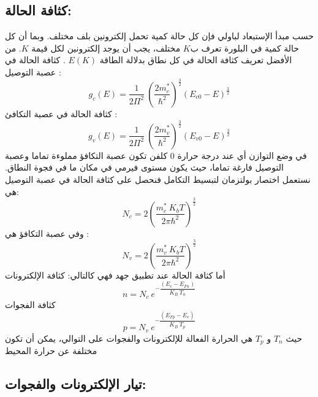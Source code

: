 \begin{itemize}
	\subsection{كثافة الحالة:}
	حسب مبدأ الإستبعاد لباولي فإن كل حالة كمية تحمل إلكترونين بلف مختلف. وبما أن كل حالة كمية في البلورة تعرف ب$ K $ مختلف، يجب أن يوجد إلكترونين لكل قيمة $ K $. 
	من الأفضل تعريف كثافة الحالة في كل نطاق بدلالة الطاقة $ E(K) $ .
	كثافة الحالة في عصبة التوصيل : 
	\begin{equation}
		g_c\left( E \right) = \frac{1}{2 \Pi^{2}}\ \left( \dfrac{2m^{*}_c}{\hbar^{2}} \right)^{\frac{3}{2}}\left(  E_{c0} - E \right)^{\frac{3}{2}}   
	\end{equation}
	كثافة الحالة في عصبة التكافئ : 
	\begin{equation}
		g_v\left( E \right) = \frac{1}{2 \Pi^{2}}\ \left( \dfrac{2m^{*}_v}{\hbar^{2}} \right)^{\frac{3}{2}}\left(  E_{v0} - E \right)^{\frac{3}{2}}   
	\end{equation}
	في وضع التوازن أي عند درجة حرارة 0 كلفن تكون عصبة التكافؤ مملوءة تماما وعصبة التوصيل فارغة تماما، حيث يكون مستوى فيرمي في مكان ما في فجوة النطاق. نستعمل اختصار بولتزمان لتبسيط التكامل فنحصل على كثافة الحالة في عصبة التوصيل هي: 
	\begin{equation}
		N_c = 2 \left( \dfrac{m^{*}_c\ K_b T}{2 \pi \hbar^{2}} \right) ^{\frac{3}{2}}
	\end{equation}
	وفي عصبة التكافؤ هي :
	\begin{equation}
		N_v = 2 \left( \dfrac{m^{*}_v\ K_b T}{2 \pi \hbar^{2}} \right) ^{\frac{3}{2}}
	\end{equation}
	أما كثافة الحالة عند تطبيق جهد فهي كالتالي:
	كثافة الإلكترونات 
	\begin{equation}
		n= N_c\ e^{-\dfrac{\left( E_c-E_{Fn} \right) }{K_B\ T_n}}
	\end{equation}
	كثافة الفجوات
	\begin{equation}
		p= N_v\ e^{-\dfrac{\left( E_{Fp}-E_v \right) }{K_B\ T_p}}
	\end{equation}
	حيث $ T_n $ و $ T_p  $ هي الحرارة الفعالة للإلكترونات والفجوات على التوالي، يمكن أن تكون مختلفة عن حرارة المحيط
	
	\subsection{ تيار الإلكترونات والفجوات:}
	

\end{itemize}
